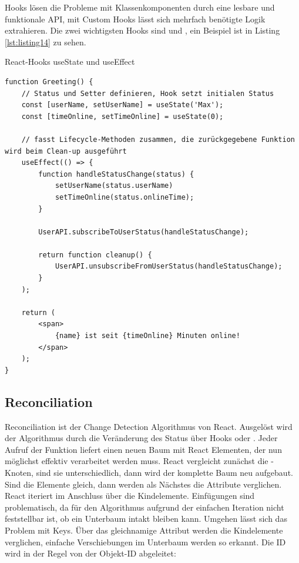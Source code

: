 Hooks lösen die Probleme mit Klassenkomponenten durch eine lesbare und funktionale API, mit Custom Hooks lässt sich mehrfach benötigte Logik extrahieren.
Die zwei wichtigsten Hooks sind  und , ein Beispiel ist in Listing \ref{lst:listing14} zu sehen.

\begin{listing}
\caption{React-Hooks useState und useEffect}
\label{lst:listing14}
\begin{verbatim}
function Greeting() {
    // Status und Setter definieren, Hook setzt initialen Status
    const [userName, setUserName] = useState('Max');
    const [timeOnline, setTimeOnline] = useState(0);

    // fasst Lifecycle-Methoden zusammen, die zurückgegebene Funktion wird beim Clean-up ausgeführt
    useEffect(() => { 
        function handleStatusChange(status) {
            setUserName(status.userName)
            setTimeOnline(status.onlineTime);    
        }

        UserAPI.subscribeToUserStatus(handleStatusChange);

        return function cleanup() {
            UserAPI.unsubscribeFromUserStatus(handleStatusChange);
        }
    );

    return (
        <span>
            {name} ist seit {timeOnline} Minuten online!
        </span>
    );
}
\end{verbatim}
\end{listing}

\subsection{Reconciliation}\label{ssec:reconciliation}
Reconciliation ist der Change Detection Algorithmus von React. Ausgelöst wird der Algorithmus durch die Veränderung des Status über Hooks oder . Jeder Aufruf der  Funktion liefert einen neuen Baum mit React Elementen, der nun möglichst effektiv verarbeitet werden muss. React vergleicht zunächst die -Knoten, sind sie unterschiedlich, dann wird der komplette Baum neu aufgebaut. Sind die Elemente gleich, dann werden als Nächstes die Attribute verglichen. React iteriert im Anschluss über die Kindelemente. Einfügungen sind problematisch, da für den Algorithmus aufgrund der einfachen Iteration nicht feststellbar ist, ob ein Unterbaum intakt bleiben kann. Umgehen lässt sich das Problem mit Keys. Über das gleichnamige Attribut werden die Kindelemente verglichen, einfache Verschiebungen im Unterbaum werden so erkannt. Die ID wird in der Regel von der Objekt-ID abgeleitet: 

